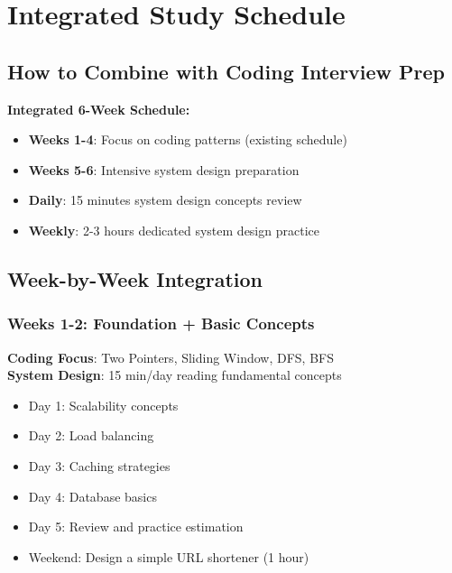 \documentclass[10pt,a4paper]{article}
\begin{document}
\section{Integrated Study Schedule}

\subsection{How to Combine with Coding Interview Prep}

\begin{frameworkbox}
\textbf{Integrated 6-Week Schedule:}
\begin{itemize}
\item \textbf{Weeks 1-4}: Focus on coding patterns (existing schedule)
\item \textbf{Weeks 5-6}: Intensive system design preparation
\item \textbf{Daily}: 15 minutes system design concepts review
\item \textbf{Weekly}: 2-3 hours dedicated system design practice
\end{itemize}
\end{frameworkbox}

\subsection{Week-by-Week Integration}

\subsubsection{Weeks 1-2: Foundation + Basic Concepts}
\textbf{Coding Focus}: Two Pointers, Sliding Window, DFS, BFS\\
\textbf{System Design}: 15 min/day reading fundamental concepts
\begin{itemize}
\item Day 1: Scalability concepts
\item Day 2: Load balancing
\item Day 3: Caching strategies
\item Day 4: Database basics
\item Day 5: Review and practice estimation
\item Weekend: Design a simple URL shortener (1 hour)
\end{itemize}
\end{document}
